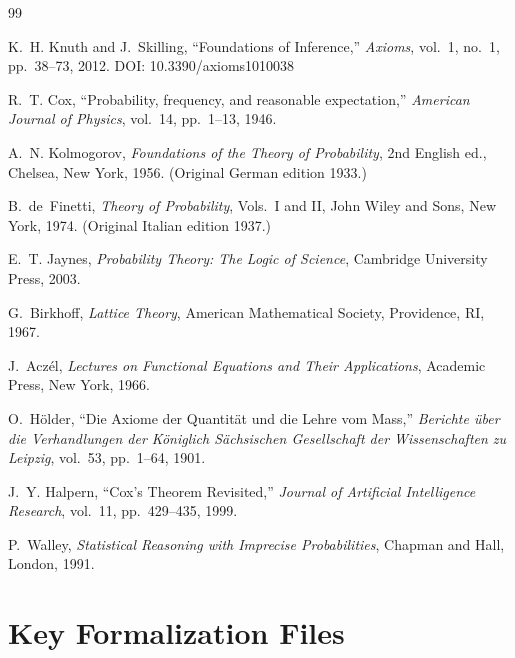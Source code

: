 \documentclass[11pt]{article}
\begin{document}
\begin{thebibliography}{99}

K.~H. Knuth and J.~Skilling,
``Foundations of Inference,''
\textit{Axioms}, vol.~1, no.~1, pp.~38--73, 2012.
DOI: 10.3390/axioms1010038

R.~T. Cox,
``Probability, frequency, and reasonable expectation,''
\textit{American Journal of Physics}, vol.~14, pp.~1--13, 1946.

A.~N. Kolmogorov,
\textit{Foundations of the Theory of Probability},
2nd English ed., Chelsea, New York, 1956. (Original German edition 1933.)

B.~de~Finetti,
\textit{Theory of Probability}, Vols.~I and II,
John Wiley and Sons, New York, 1974. (Original Italian edition 1937.)

E.~T. Jaynes,
\textit{Probability Theory: The Logic of Science},
Cambridge University Press, 2003.

G.~Birkhoff,
\textit{Lattice Theory},
American Mathematical Society, Providence, RI, 1967.

J.~Acz\'{e}l,
\textit{Lectures on Functional Equations and Their Applications},
Academic Press, New York, 1966.

O.~H\"{o}lder,
``Die Axiome der Quantit\"{a}t und die Lehre vom Mass,''
\textit{Berichte \"{u}ber die Verhandlungen der K\"{o}niglich S\"{a}chsischen
Gesellschaft der Wissenschaften zu Leipzig}, vol.~53, pp.~1--64, 1901.

J.~Y. Halpern,
``Cox's Theorem Revisited,''
\textit{Journal of Artificial Intelligence Research}, vol.~11, pp.~429--435, 1999.


P.~Walley,
\textit{Statistical Reasoning with Imprecise Probabilities},
Chapman and Hall, London, 1991.

\end{thebibliography}

\appendix
\section{Key Formalization Files}
\end{document}
